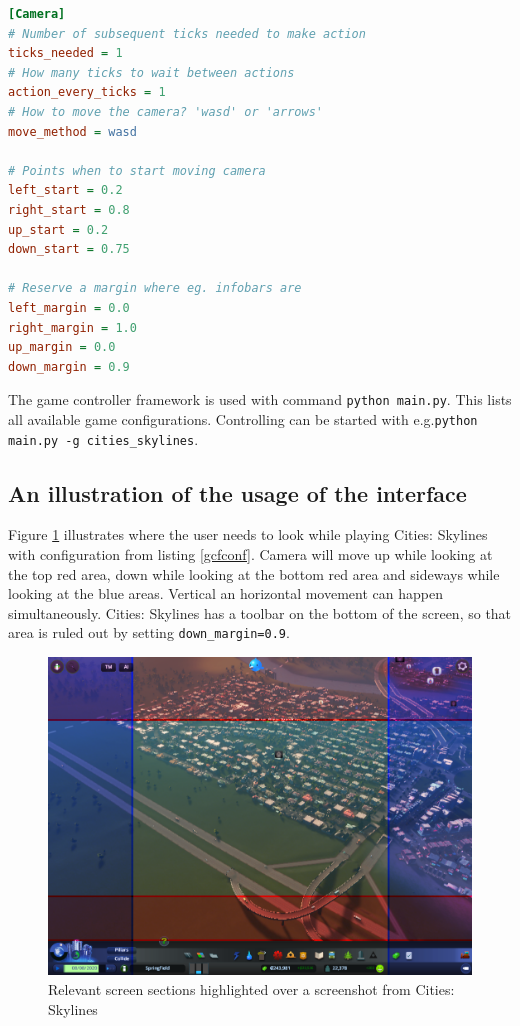 \documentclass[english]{tktltiki}
\begin{document}
\bigskip
\begin{lstlisting}[language={Ini},caption={Example of game-specific configuration file},label={gcfconf}]
[Camera]
# Number of subsequent ticks needed to make action
ticks_needed = 1
# How many ticks to wait between actions
action_every_ticks = 1
# How to move the camera? 'wasd' or 'arrows'
move_method = wasd

# Points when to start moving camera
left_start = 0.2
right_start = 0.8
up_start = 0.2
down_start = 0.75

# Reserve a margin where eg. infobars are
left_margin = 0.0
right_margin = 1.0
up_margin = 0.0
down_margin = 0.9
\end{lstlisting}
\bigskip

The game controller framework is used with command \verb|python main.py|. This lists all available game configurations. Controlling can be started with e.g.\newline \verb|python main.py -g cities_skylines|.

\subsection{An illustration of the usage of the interface}

Figure \ref{citiesskylines} illustrates where the user needs to look while playing Cities: Skylines with configuration from listing \ref{gcfconf}. Camera will move up while looking at the top red area, down while looking at the bottom red area and sideways while looking at the blue areas. Vertical an horizontal movement can happen simultaneously. Cities: Skylines has a toolbar on the bottom of the screen, so that area is ruled out by setting \verb|down_margin=0.9|.

\begin{figure}[h]
\begin{center}
\includegraphics[width=1\textwidth]{cities_skylines.png}
\caption{Relevant screen sections highlighted over a screenshot from Cities: Skylines}
\label{citiesskylines}
\end{center}
\end{figure}
\end{document}
